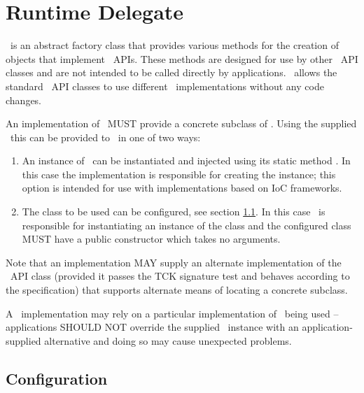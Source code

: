 \chapter{Runtime Delegate}

\rd\ is an abstract factory class that provides various methods for the creation of objects that implement \jaxrs\ APIs. These methods are designed for use by other \jaxrs\ API classes and are not intended to be called directly by applications. \rd\ allows the standard \jaxrs\ API classes to use different \jaxrs\ implementations without any code changes.

An implementation of \jaxrs\ MUST provide a concrete subclass of \rd. Using the supplied \rd\ this can be provided to \jaxrs\ in one of two ways:

\begin{enumerate}
\item An instance of \rd\ can be instantiated and injected using its static method . In this case the implementation is responsible for creating the instance; this option is intended for use with implementations based on IoC frameworks.
\item The class to be used can be configured, see section \ref{rdconfig}. In this case \jaxrs\ is responsible for instantiating an instance of the class and the configured class MUST have a public constructor which takes no arguments.
\end{enumerate}

Note that an implementation MAY supply an alternate implementation of the \rd\ API class (provided it passes the TCK signature test and behaves according to the specification) that supports alternate means of locating a concrete subclass.

A \jaxrs\ implementation may rely on a particular implementation of \rd\ being used -- applications SHOULD NOT override the supplied \rd\ instance with an application-supplied alternative and doing so may cause unexpected problems. 

\section{Configuration}\label{rdconfig}

